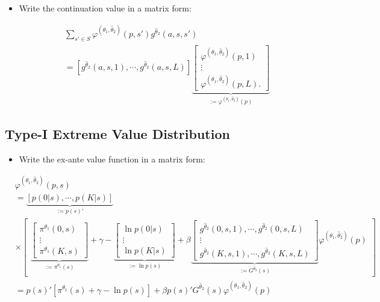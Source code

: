 \documentclass[]{book}
\providecommand{\tightlist}{%
  \setlength{\itemsep}{0pt}\setlength{\parskip}{0pt}}
\begin{document}
\begin{itemize}
\tightlist
\item
  Write the continuation value in a matrix form:

  \begin{equation}
  \begin{split}
  & \sum_{s' \in S} \varphi^{(\theta_1, \hat{\theta}_2)}(p, s') g^{\hat{\theta}_2}(a, s, s')\\
  & = [g^{\hat{\theta}_2}(a, s, 1), \cdots, g^{\hat{\theta}_2}(a, s, L)] 
  \underbrace{\begin{bmatrix}
  \varphi^{(\theta_1, \hat{\theta}_2)}(p, 1)\\
  \vdots\\
  \varphi^{(\theta_1, \hat{\theta}_2)}(p, L).
  \end{bmatrix}}_{:= \varphi^{(\theta_1, \hat{\theta}_2)}(p)}
  \end{split}
  \end{equation}
\end{itemize}

\subsection{Type-I Extreme Value
Distribution}\label{type-i-extreme-value-distribution-4}

\begin{itemize}
\tightlist
\item
  Write the ex-ante value function in a matrix form:
\end{itemize}

\begin{equation}
\begin{split}
&\varphi^{(\theta_1, \hat{\theta}_2)}(p, s)\\
&=\underbrace{[p(0|s), \cdots, p(K|s)]}_{:= p(s)'} \\
&\times\begin{bmatrix}
\underbrace{\begin{bmatrix}
\pi^{\theta_1}(0, s)\\
\vdots\\
\pi^{\theta_1}(K, s)
\end{bmatrix}}_{:= \pi^{\theta_1}(s)}
+ \gamma
-
\underbrace{\begin{bmatrix}
\ln p(0|s)\\
\vdots\\
\ln p(K|s)
\end{bmatrix}}_{:= \ln p(s)}
+\beta
\underbrace{\begin{bmatrix}
g^{\hat{\theta}_2}(0, s, 1), \cdots, g^{\hat{\theta}_2}(0, s, L)\\
\vdots\\
g^{\hat{\theta}_2}(K, s, 1), \cdots, g^{\hat{\theta}_2}(K, s, L)
\end{bmatrix}}_{:= G^{\hat{\theta}_2}(s)}
\varphi^{(\theta_1, \hat{\theta}_2)}(p)
\end{bmatrix}\\
&=p(s)'[\pi^{\theta_1}(s) + \gamma - \ln p(s)] + \beta p(s)' G^{\hat{\theta}_2}(s)  \varphi^{(\theta_1, \hat{\theta}_2)}(p)
\end{split}
\end{equation}
\end{document}
